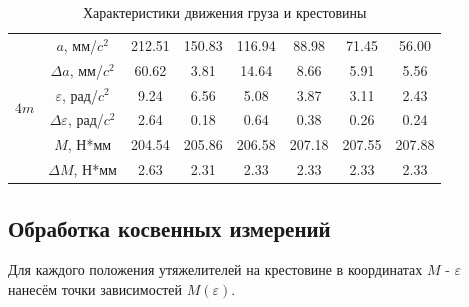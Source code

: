 \documentclass[12pt, a4paper]{article}
\begin{document}
\begin{table}[h!]
\begin{center}
\begin{tabular}{|c|c|c|c|c|c|c|c|}
\cline{2-8} 
\hline 
\multirow{6}{*}{$4 m $} & $a$, мм/$c^2$ &212.51 & 150.83 & 116.94 & 88.98 & 71.45 & 56.00\\[5pt] 
\cline{2-8} 
&$\Delta a$, мм/$c^2$&60.62 & 3.81 & 14.64 & 8.66 & 5.91 & 5.56\\[5pt] 
\cline{2-8} 
& $\varepsilon$, рад/$c^2$ &9.24 & 6.56 & 5.08 & 3.87 & 3.11 & 2.43\\[5pt] 
\cline{2-8} 
&$\Delta \varepsilon$, рад/$c^2$ &2.64 & 0.18 & 0.64 & 0.38 & 0.26 & 0.24\\[5pt] 
\cline{2-8} 
&$M$, Н*мм &204.54 & 205.86 & 206.58 & 207.18 & 207.55 & 207.88\\[5pt] 
\cline{2-8} 
&$\Delta M$, Н*мм &2.63 & 2.31 & 2.33 & 2.33 & 2.33 & 2.33\\[5pt] 
\cline{2-8} 
\hline 


\end{tabular}
\caption{Характеристики движения груза и крестовины}
\end{center}
\label{tab:3}
\end{table}


\clearpage
\subsection{Обработка косвенных измерений}
Для каждого положения утяжелителей на крестовине в координатах $M$ - $\varepsilon$ нанесём точки зависимостей $M(\varepsilon)$.
\end{document}

